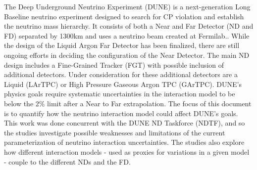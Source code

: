 \documentclass[12pt]{article}
\begin{document}
The Deep Underground Neutrino Experiment (DUNE) is a next-generation Long Baseline neutrino experiment designed to search for CP violation and establish the neutrino mass hierarchy. It consists of both a Near and Far Detector (ND and FD) separated by 1300km and uses a neutrino beam created at Fermilab.\cite{DUNE_CDR1}. While the design of the Liquid Argon Far Detector has been finalized, there are still ongoing efforts in deciding the configuration of the Near Detector. The main ND design includes a Fine-Grained Tracker (FGT) with possible inclusion of additional detectors. Under consideration for these additional detectors are a Liquid (LArTPC) or High Pressure Gaseous Argon TPC (GArTPC). DUNE's physics goals require systematic uncertainties in the interaction model to be below the 2\% limit after a Near to Far extrapolation\cite{DUNE_review}. The focus of this document is to quantify how the neutrino interaction model could affect DUNE's goals. This work was done concurrent with the DUNE ND Taskforce (NDTF), and so the studies investigate possible weaknesses and limitations of the current parameterization of neutrino interaction uncertainties. The studies also explore how different interaction models - used as proxies for variations in a given model - couple to the different NDs and the FD.
\end{document}
